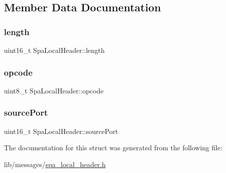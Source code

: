 \subsection{Member Data Documentation}
\mbox{\label{structSpaLocalHeader_ab76a9a428b56a4e4a1107fb5eff646eb}} 
\subsubsection{\texorpdfstring{length}{length}}
{\footnotesize\ttfamily uint16\+\_\+t Spa\+Local\+Header\+::length}

\mbox{\label{structSpaLocalHeader_a20fa821200ae49a2c91177f43c7446f4}} 
\subsubsection{\texorpdfstring{opcode}{opcode}}
{\footnotesize\ttfamily uint8\+\_\+t Spa\+Local\+Header\+::opcode}

\mbox{\label{structSpaLocalHeader_aae0d511805a74a60aea014a22aefe484}} 
\subsubsection{\texorpdfstring{source\+Port}{sourcePort}}
{\footnotesize\ttfamily uint16\+\_\+t Spa\+Local\+Header\+::source\+Port}



The documentation for this struct was generated from the following file\+:\begin{DoxyCompactItemize}
\item 
lib/messages/\hyperlink{spa__local__header_8h}{spa\+\_\+local\+\_\+header.\+h}\end{DoxyCompactItemize}
